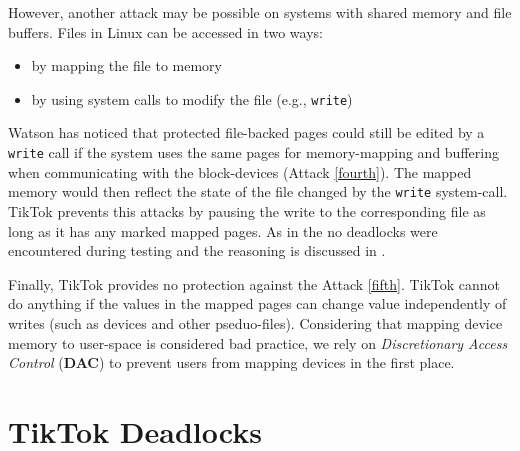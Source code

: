 However, another attack may be possible on systems with shared memory and file buffers.
Files in Linux can be accessed in two ways:
\begin{itemize}
    \item by mapping the file to memory
    \item by using system calls to modify the file (e.g., \texttt{write})
\end{itemize}

Watson\cite{watson2007exploiting} has noticed that protected file-backed pages
could still be edited by a \texttt{write} call if the system uses the same pages
for memory-mapping and buffering when communicating with the block-devices
(Attack \ref{fourth}). The mapped memory would then reflect the state of the
file changed by the \texttt{write} system-call. TikTok prevents this attacks by
pausing the write to the corresponding file as long as it has any marked mapped
pages. As in the  no deadlocks were encountered during
testing and the reasoning is discussed in . 

Finally, TikTok provides no protection against the Attack \ref{fifth}. TikTok
cannot do anything if the values in the mapped pages can change value
independently of writes (such as devices and other pseduo-files). Considering
that mapping device memory to user-space is considered bad practice, we rely on
\emph{Discretionary Access Control} (\textbf{DAC}) to prevent users from mapping
devices in the first place.


\section{TikTok Deadlocks}
\label{sec:deadlocks}

